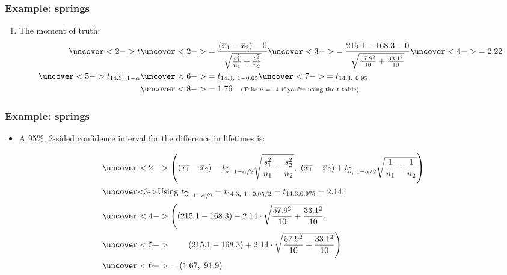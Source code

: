 \documentclass[handout]{beamer}\usepackage[]{graphicx}\usepackage[]{color}
\providecommand{\ov}[1]{\overline{#1}}
\providecommand{\wh}[1]{\widehat{#1}}
\numberwithin{equation}{section}
\begin{document}
\begin{frame}
\frametitle{Example: springs}
\begin{enumerate}[1. ]
 \setcounter{enumi}{\value{saveenum}}
\item The moment of truth:
\begin{align*}
\uncover<2->{t} & \uncover<2->{=  \frac{(\ov{x}_1 - \ov{x}_2) - 0}{ \sqrt{\frac{s_1^2}{n_1} + \frac{s_2^2}{n_2}}}} \uncover<3->{ = \frac{215.1 - 168.3 - 0}{ \sqrt{\frac{57.9^2}{10} + \frac{33.1^2}{10}}}} \uncover<4->{ = 2.22} \\
\uncover<5->{t_{14.3, \ 1 - \alpha}} & \uncover<6->{= t_{14.3, \ 1 - 0.05}} \uncover<7->{ = t_{14.3, \ 0.95}}  \\
&\uncover<8->{= 1.76 \quad \text{\scriptsize (Take $\nu = 14$ if you're using the t table)}}
\end{align*}
\end{enumerate}
\end{frame}


\begin{frame}
\frametitle{Example: springs} \scriptsize
\begin{itemize}
\item A 95\%, 2-sided confidence interval for the difference in lifetimes is:
\end{itemize}
\begin{align*}
&\uncover<2->{\left ((\ov{x_1} - \ov{x}_2) - t_{\wh{\nu}, \ 1 - \alpha/2} \sqrt{\frac{s_1^2}{n_1} + \frac{s_2^2}{n_2}} , \ (\ov{x_1} - \ov{x}_2) + t_{\wh{\nu}, \ 1 - \alpha/2} \sqrt{\frac{1}{n_1} + \frac{1}{n_2}} \right )} \\
\intertext{\uncover<3->{Using $t_{\wh{\nu}, \ 1 - \alpha/2} = t_{14.3, \ 1 - 0.05/2} = t_{14.3, 0.975} = 2.14$:}}
&\uncover<4->{\left ((215.1 - 168.3) - 2.14 \cdot  \sqrt{\frac{57.9^2}{10} + \frac{33.1^2}{10}} , \right .} \\ 
&\uncover<5->{ \qquad \left . (215.1 - 168.3) + 2.14 \cdot  \sqrt{\frac{57.9^2}{10} + \frac{33.1^2}{10}} \right )} \\
&\uncover<6->{=  (1.67, \ 91.9)}
\end{align*}
\begin{itemize}
\end{itemize}
\end{frame}
\end{document}

